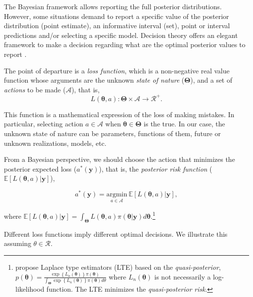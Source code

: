 The Bayesian framework allows reporting the full posterior distributions. However, some situations demand to report a specific value of the posterior distribution (point estimate), an informative interval (set), point or interval predictions and/or selecting a specific model. Decision theory offers an elegant framework to make a decision regarding what are the optimal posterior values to report \cite{berger2013statistical}.

The point of departure is a \textit{loss function}, which is a non-negative real value function whose arguments are the unknown \textit{state of nature} ($\mathbf{\Theta}$), and a set of \textit{actions} to be made ($\mathcal{A}$), that is, 
\begin{equation*}
	L(\bm{\theta}, a):\mathbf{\Theta}\times \mathcal{A}\rightarrow \mathcal{R}^+.
\end{equation*}

This function is a mathematical expression of the loss of making mistakes. In particular, selecting action $a\in\mathcal{A}$ when $\bm{\theta}\in\mathbf{\Theta}$ is the true. In our case, the unknown state of nature can be parameters, functions of them, future or unknown realizations, models, etc.

From a Bayesian perspective, we should choose the action that minimizes the posterior expected loss ($a^*(\mathbf{y})$), that is, the \textit{posterior risk function} ($\mathbb{E}[L(\bm{\theta}, a)|\mathbf{y}]$),

\begin{equation*}
	a^*(\mathbf{y})=\underset{a \in \mathcal{A}}{\mathrm{argmin}} \  \mathbb{E}[L(\bm{\theta}, a)|\mathbf{y}], 
\end{equation*}

where $\mathbb{E}[L(\bm{\theta}, a)|\mathbf{y}]= \int_{\mathbf{\Theta}} L(\bm{\theta}, a)\pi(\bm{\theta}|\mathbf{y})d\bm{\theta}$.\footnote{\cite{Chernozhukov2003} propose Laplace type estimators (LTE) based on the \textit{quasi-posterior}, $p(\bm{\theta})=\frac{\exp\left\{L_n(\bm{\theta})\right\}\pi(\bm{\theta})}{\int_{\mathbf{\Theta}}\exp\left\{L_n(\bm{\theta})\right\}\pi(\bm{\theta})d\theta}$ where $L_n(\bm{\theta})$ is not necessarily a log-likelihood function. The LTE minimizes the \textit{quasi-posterior risk}.}

Different loss functions imply different optimal decisions. We illustrate this assuming $\theta \in \mathcal{R}$.

